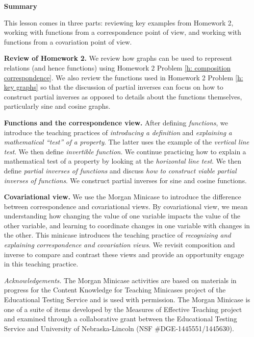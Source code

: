 \documentclass[11pt]{article}
\newcommand\header[1]{\vspace*{4pt}\par {\large {\bf #1}}\par}
\theoremstyle{definition}
\begin{document}
\header{Summary}

This lesson comes in three parts: reviewing key examples from Homework 2, working with functions from a correspondence point of view, and working with functions from a covariation point of view.

{\bf Review of Homework 2.} We review how graphs can be used to represent relations (and hence functions) using Homework 2 Problem \ref{h: composition correspondence}. We also review the functions used in Homework 2 Problem \ref{h: key graphs} so that the discussion of partial inverses can focus on how to construct partial inverses as opposed to details about the functions themselves, particularly sine and cosine graphs.

{\bf Functions and the correspondence view.} After defining {\it functions}, we introduce the teaching practices of {\it introducing a definition} and {\it explaining a mathematical ``test'' of a property}. The latter uses the example of the {\it vertical line test}.   We then define {\it invertible function}. We continue practicing how to explain a mathematical test of a property by looking at the {\it horizontal line test}. We then define {\it partial inverses of functions} and discuss {\it how to construct viable partial inverses of functions}. We construct partial inverses for sine and cosine functions.

{\bf Covariational view.} We use the Morgan Minicase to introduce the difference between correspondence and covariational views. By covariational view, we mean understanding how changing the value of one variable impacts the value of the other variable, and learning to coordinate changes in one variable with changes in the other. This minicase introduces the teaching practice of {\it recognizing and explaining correspondence and covariation views}. We revisit composition and inverse to compare and contrast these views and provide an opportunity engage in this teaching practice. 

{\it Acknowledgements.} The Morgan Minicase activities are based on materials in progress for the Content Knowledge for Teaching Minicases project of the Educational Testing Service and is used with permission. The Morgan Minicase is one of a suite of items developed by the Measures of Effective Teaching project and examined through a collaborative grant between the Educational Testing Service and University of Nebraska-Lincoln (NSF \#DGE-1445551/1445630).

\end{document}
